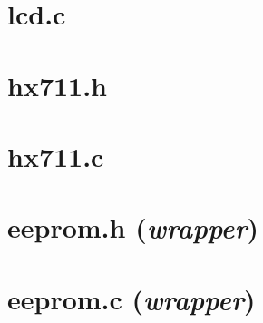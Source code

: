 \begin{appendices}
{	\section*{lcd.c}
	
	\newpage
	\section*{hx711.h}
	
	\newpage
	\section*{hx711.c}
	
	\newpage
	\section*{eeprom.h (\textit{wrapper})}
	
	\newpage
	\section*{eeprom.c (\textit{wrapper})}
	
	}
	\restoregeometry
	\newpage
	
	\newpage
	
\end{appendices}
